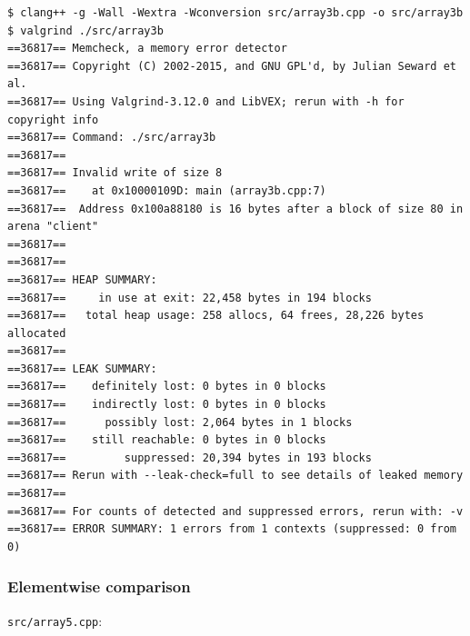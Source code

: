 \documentclass[12pt,letterpaper,twoside]{article}
\begin{document}
\begin{verbatim}
$ clang++ -g -Wall -Wextra -Wconversion src/array3b.cpp -o src/array3b
$ valgrind ./src/array3b
==36817== Memcheck, a memory error detector
==36817== Copyright (C) 2002-2015, and GNU GPL'd, by Julian Seward et al.
==36817== Using Valgrind-3.12.0 and LibVEX; rerun with -h for copyright info
==36817== Command: ./src/array3b
==36817== 
==36817== Invalid write of size 8
==36817==    at 0x10000109D: main (array3b.cpp:7)
==36817==  Address 0x100a88180 is 16 bytes after a block of size 80 in arena "client"
==36817== 
==36817== 
==36817== HEAP SUMMARY:
==36817==     in use at exit: 22,458 bytes in 194 blocks
==36817==   total heap usage: 258 allocs, 64 frees, 28,226 bytes allocated
==36817== 
==36817== LEAK SUMMARY:
==36817==    definitely lost: 0 bytes in 0 blocks
==36817==    indirectly lost: 0 bytes in 0 blocks
==36817==      possibly lost: 2,064 bytes in 1 blocks
==36817==    still reachable: 0 bytes in 0 blocks
==36817==         suppressed: 20,394 bytes in 193 blocks
==36817== Rerun with --leak-check=full to see details of leaked memory
==36817== 
==36817== For counts of detected and suppressed errors, rerun with: -v
==36817== ERROR SUMMARY: 1 errors from 1 contexts (suppressed: 0 from 0)
\end{verbatim}

\hypertarget{elementwise-comparison}{%
\subsubsection{Elementwise comparison}\label{elementwise-comparison}}

\texttt{src/array5.cpp}:
\end{document}
